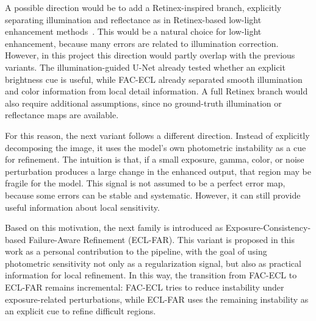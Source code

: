 A possible direction would be to add a Retinex-inspired branch, explicitly separating illumination and reflectance as in Retinex-based low-light enhancement methods~\cite{DBLP:conf/bmvc/WeiWY018}. This would be a natural choice for low-light enhancement, because many errors are related to illumination correction. However, in this project this direction would partly overlap with the previous variants. The illumination-guided U-Net already tested whether an explicit brightness cue is useful, while FAC-ECL already separated smooth illumination and color information from local detail information. A full Retinex branch would also require additional assumptions, since no ground-truth illumination or reflectance maps are available.

For this reason, the next variant follows a different direction. Instead of explicitly decomposing the image, it uses the model's own photometric instability as a cue for refinement. The intuition is that, if a small exposure, gamma, color, or noise perturbation produces a large change in the enhanced output, that region may be fragile for the model. This signal is not assumed to be a perfect error map, because some errors can be stable and systematic. However, it can still provide useful information about local sensitivity.

Based on this motivation, the next family is introduced as Exposure-Consistency-based Failure-Aware Refinement (ECL-FAR). This variant is proposed in this work as a personal contribution to the pipeline, with the goal of using photometric sensitivity not only as a regularization signal, but also as practical information for local refinement. In this way, the transition from FAC-ECL to ECL-FAR remains incremental: FAC-ECL tries to reduce instability under exposure-related perturbations, while ECL-FAR uses the remaining instability as an explicit cue to refine difficult regions.